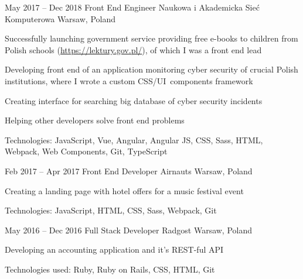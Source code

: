 \begin{sectionlist}
    \sectionlistitemjob
        {May 2017 -- Dec 2018}
        {Front End Engineer}
        {Naukowa i Akademicka Sie\'{c} Kom\-pu\-te\-ro\-wa \hfill \linebreak}
        {Warsaw, Poland}
        {
            \begin{joblisting}
                \item Successfully launching government service providing free
                    e-books to children from Polish schools
                    (\url{https://lektury.gov.pl/}), of which I was a front end
                    lead
                \item Developing front end of an application monitoring
                    cyber security of crucial Polish institutions,
                    where I wrote a custom CSS/UI~components framework
                \item Creating interface for searching big database of cyber
                    security incidents
                \item Helping other developers solve front end problems
                \item Technologies: JavaScript, Vue, Angular, Angular JS,
                    CSS, Sass, HTML, Webpack, Web Components, Git,
                    TypeScript
            \end{joblisting}
        }

    \sectionlistitemjob
        {Feb 2017 -- Apr 2017}
        {Front End Developer}
        {Airnauts}
        {Warsaw, Poland}
        {
            \begin{joblisting}
                \item Creating a landing page with hotel offers for a music
                    festival event
                \item Technologies: JavaScript, HTML, CSS, Sass, Webpack,
                    Git
            \end{joblisting}
        }

    \sectionlistitemjob
        {May 2016 -- Dec 2016}
        {Full Stack Developer}
        {Radgost}
        {Warsaw, Poland}
        {
            \begin{joblisting}
                \item Developing an accounting application and it's REST-ful
                    API
                \item Technologies used: Ruby, Ruby on Rails, CSS, HTML, Git
            \end{joblisting}
        }


\end{sectionlist}
